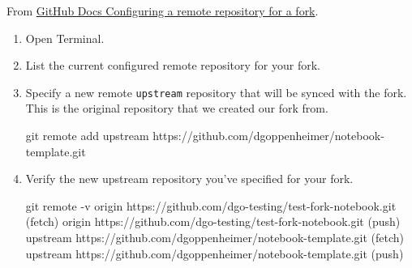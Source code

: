 \documentclass[
  letterpaper,
  DIV=11,
  numbers=noendperiod]{scrreprt}
\newenvironment{Shaded}{\begin{snugshade}}{\end{snugshade}}
\newcommand{\AttributeTok}[1]{\textcolor[rgb]{0.40,0.45,0.13}{#1}}
\newcommand{\ErrorTok}[1]{\textcolor[rgb]{0.68,0.00,0.00}{#1}}
\newcommand{\ExtensionTok}[1]{\textcolor[rgb]{0.00,0.23,0.31}{#1}}
\newcommand{\FunctionTok}[1]{\textcolor[rgb]{0.28,0.35,0.67}{#1}}
\newcommand{\KeywordTok}[1]{\textcolor[rgb]{0.00,0.23,0.31}{#1}}
\newcommand{\NormalTok}[1]{\textcolor[rgb]{0.00,0.23,0.31}{#1}}
\newcommand{\OperatorTok}[1]{\textcolor[rgb]{0.37,0.37,0.37}{#1}}
\begin{document}
From
\href{https://docs.github.com/en/pull-requests/collaborating-with-pull-requests/working-with-forks/configuring-a-remote-repository-for-a-fork}{GitHub
Docs Configuring a remote repository for a fork}.

\begin{enumerate}
\def\labelenumi{\arabic{enumi}.}
\item
  Open Terminal.
\item
  List the current configured remote repository for your fork.

\begin{Shaded}
\end{Shaded}
\item
  Specify a new remote \texttt{upstream} repository that will be synced
  with the fork. This is the original repository that we created our
  fork from.

\begin{Shaded}
\begin{Highlighting}[]
\FunctionTok{git}\NormalTok{ remote add upstream https://github.com/dgoppenheimer/notebook{-}template.git}
\end{Highlighting}
\end{Shaded}
\item
  Verify the new upstream repository you've specified for your fork.

\begin{Shaded}
\begin{Highlighting}[]
\FunctionTok{git}\NormalTok{ remote }\AttributeTok{{-}v}
\ExtensionTok{origin}\NormalTok{  https://github.com/dgo{-}testing/test{-}fork{-}notebook.git }\ErrorTok{(}\ExtensionTok{fetch}\KeywordTok{)}
\ExtensionTok{origin}\NormalTok{  https://github.com/dgo{-}testing/test{-}fork{-}notebook.git }\ErrorTok{(}\ExtensionTok{push}\KeywordTok{)}
\ExtensionTok{upstream}\NormalTok{ https://github.com/dgoppenheimer/notebook{-}template.git }\ErrorTok{(}\ExtensionTok{fetch}\KeywordTok{)}
\ExtensionTok{upstream}\NormalTok{ https://github.com/dgoppenheimer/notebook{-}template.git }\ErrorTok{(}\ExtensionTok{push}\KeywordTok{)}
\end{Highlighting}
\end{Shaded}
\end{enumerate}
\end{document}
